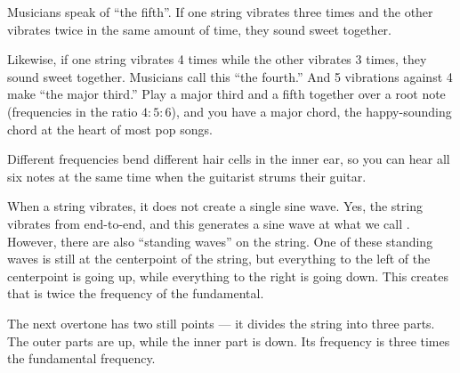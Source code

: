 Musicians speak of ``the fifth''.  If one string vibrates three times
and the other vibrates twice in the same amount of time, they sound
sweet together.

Likewise, if one string vibrates 4 times while the other vibrates 3 times,
they sound sweet together. Musicians call this ``the fourth.'' And 5
vibrations against 4 make ``the major third.'' Play a major third and a
fifth together over a root note (frequencies in the ratio $4 : 5 : 6$),
and you have a major chord, the happy-sounding chord at the heart of most
pop songs.

Different frequencies bend different hair cells in the inner ear, so you can hear all six notes at the same time when
the guitarist strums their guitar.

When a string vibrates, it does not create a single sine wave. Yes, the
string vibrates from end-to-end, and this generates a sine wave at what
we call . However, there are also
``standing waves'' on the string. One of these standing waves is
still at the centerpoint of the string, but everything to the left of
the centerpoint is going up, while everything to the right is going
down. This creates  that is twice the frequency
of the fundamental.

\begin{center}
    
\end{center}
The next overtone has two still points --- it divides the string into
three parts.  The outer parts are up, while the inner part is
down. Its frequency is three times the fundamental frequency.

